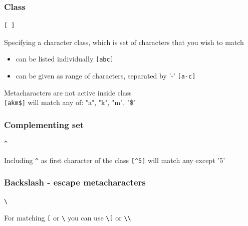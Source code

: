 \documentclass{beamer}
\begin{document}
\subsubsection{Class}
\begin{frame}[fragile]
\begin{verbatim}
[ ]
\end{verbatim}
Specifying a character class, which is set of characters that you wish to match
 \begin{itemize}
  \item can be listed individually \verb/[abc]/
  \item can be given as range of characters, separated by '-' \verb/[a-c]/
 \end{itemize}
\pause
Metacharacters are not active inside class \\
\verb/[akm$]/ will match any of: "a", "k", "m", "\$"
\end{frame}

\subsubsection{Complementing set}
\begin{frame}[fragile]
\begin{verbatim}
^
\end{verbatim}
Including \verb/^/ as first character of the class \verb/[^5]/ will match any except '5'
\end{frame}

\subsubsection{Backslash - escape metacharacters}
\begin{frame}[fragile]
\begin{verbatim}
\
\end{verbatim}
For matching \verb/[/ or \verb/\/ you can use \verb/\[/ or \verb/\\/
\end{frame}
\end{document}
